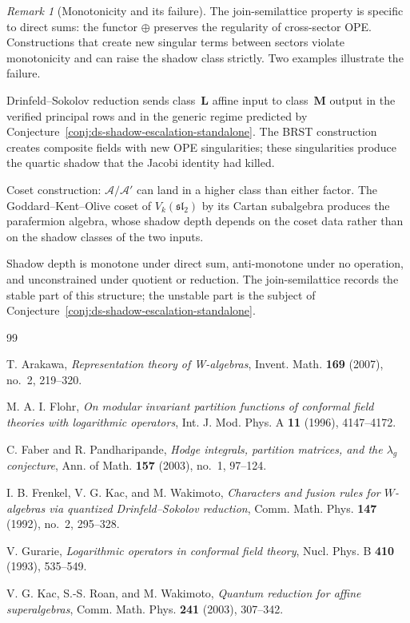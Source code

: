 \documentclass[11pt]{article}
\theoremstyle{plain}
\theoremstyle{definition}
\theoremstyle{remark}
\newtheorem{remark}[theorem]{Remark}
\providecommand{\cA}{\mathcal{A}}
\begin{document}
\begin{remark}[Monotonicity and its failure]
\label{rem:semilattice-limitations}
The join-semilattice property is specific to direct sums: the
functor $\oplus$ preserves the regularity of cross-sector OPE.
Constructions that create new singular terms between sectors
violate monotonicity and can raise the shadow class strictly.
Two examples illustrate the failure.

Drinfeld--Sokolov reduction sends class~$\mathbf{L}$ affine
input to class~$\mathbf{M}$ output in the verified principal rows
and in the generic regime predicted by
Conjecture~\ref{conj:ds-shadow-escalation-standalone}. The BRST
construction creates composite fields with new OPE singularities;
these singularities produce the quartic shadow that the Jacobi
identity had killed.

Coset construction: $\cA / \cA'$ can land in a higher class
than either factor. The Goddard--Kent--Olive coset of
$V_k(\mathfrak{sl}_2)$ by its Cartan subalgebra produces the
parafermion algebra, whose shadow depth depends on the coset
data rather than on the shadow classes of the two inputs.

Shadow depth is monotone under direct sum, anti-monotone under
no operation, and unconstrained under quotient or reduction.
The join-semilattice records the stable part of this structure;
the unstable part is the subject of
Conjecture~\ref{conj:ds-shadow-escalation-standalone}.
\end{remark}

\begin{thebibliography}{99}

T. Arakawa, \emph{Representation theory of W-algebras}, Invent.
Math. \textbf{169} (2007), no.~2, 219--320.

M. A. I. Flohr, \emph{On modular invariant partition functions of
conformal field theories with logarithmic operators}, Int. J. Mod.
Phys. A \textbf{11} (1996), 4147--4172.

C. Faber and R. Pandharipande, \emph{Hodge integrals, partition
matrices, and the $\lambda_g$ conjecture}, Ann. of Math. \textbf{157}
(2003), no.~1, 97--124.

I. B. Frenkel, V. G. Kac, and M. Wakimoto, \emph{Characters and
fusion rules for $W$-algebras via quantized Drinfeld--Sokolov
reduction}, Comm. Math. Phys. \textbf{147} (1992), no.~2, 295--328.

V. Gurarie, \emph{Logarithmic operators in conformal field theory},
Nucl. Phys. B \textbf{410} (1993), 535--549.

V. G. Kac, S.-S. Roan, and M. Wakimoto, \emph{Quantum reduction for
affine superalgebras}, Comm. Math. Phys. \textbf{241} (2003),
307--342.

\end{thebibliography}

\ifdefined\shadowtowervtwoincluded
\else
\end{document}

